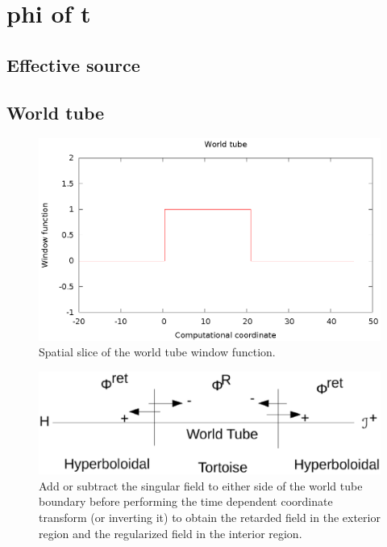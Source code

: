 \section{phi of t}
\subsection{Effective source}
\subsection{World tube}
\begin{figure}
\includegraphics{worldTubeItself}
\caption{Spatial slice of the world tube window function.}
\end{figure}
\begin{figure}
  \includegraphics{WorldTube}
  \caption{Add or subtract the singular field to either side of the world tube boundary before performing the time dependent coordinate transform (or inverting it) to obtain the retarded field in the exterior region and the regularized field in the interior region.}

\end{figure}


